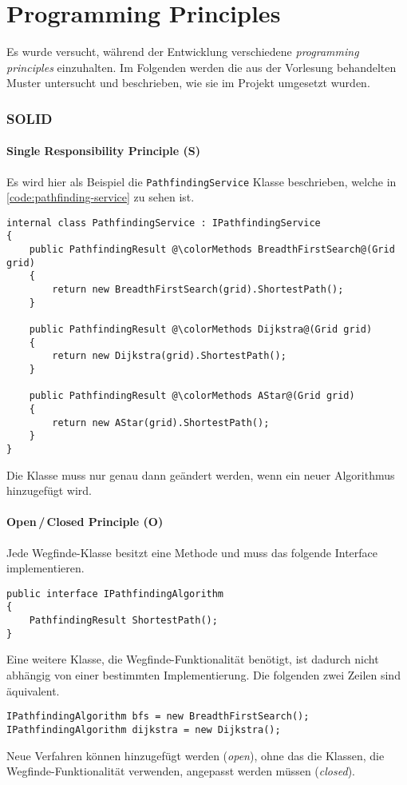 \part{Programming Principles} \label{part:programming-principles}
Es wurde versucht, während der Entwicklung
verschiedene \textit{programming principles} einzuhalten.
Im Folgenden werden die aus der Vorlesung behandelten Muster untersucht und
beschrieben, wie sie im Projekt umgesetzt wurden.

\section{SOLID}

\subsection{Single Responsibility Principle (S)}
Es wird hier als Beispiel die \lstinline{PathfindingService} Klasse
beschrieben, welche in \autoref{code:pathfinding-service} zu sehen ist.
\begin{lstlisting}[caption={\lstinline{PathfindingService} Klasse},
    label={code:pathfinding-service}]
internal class PathfindingService : IPathfindingService
{
    public PathfindingResult @\colorMethods BreadthFirstSearch@(Grid grid)
    {
        return new BreadthFirstSearch(grid).ShortestPath();
    }

    public PathfindingResult @\colorMethods Dijkstra@(Grid grid)
    {
        return new Dijkstra(grid).ShortestPath();
    }

    public PathfindingResult @\colorMethods AStar@(Grid grid)
    {
        return new AStar(grid).ShortestPath();
    }
}
\end{lstlisting}
Die Klasse muss nur genau dann geändert werden,
wenn ein neuer Algorithmus hinzugefügt wird.

\subsection{Open\,/\,Closed Principle (O)}
Jede Wegfinde-Klasse besitzt eine Methode 
und muss das folgende Interface implementieren.
\begin{lstlisting}[caption={Wegfinde-Algorithmus Interface},label={code:i-pathfinding}]
public interface IPathfindingAlgorithm
{
    PathfindingResult ShortestPath();
}
\end{lstlisting}
Eine weitere Klasse, die Wegfinde-Funktionalität benötigt, ist dadurch nicht abhängig
von einer bestimmten Implementierung. Die folgenden zwei Zeilen sind äquivalent.
\begin{lstlisting}[caption={Abstraktion der Wegfinde-Algorithmen},
label={code:pathfinding-abstracttion}]
IPathfindingAlgorithm bfs = new BreadthFirstSearch();
IPathfindingAlgorithm dijkstra = new Dijkstra();
\end{lstlisting}
Neue Verfahren können hinzugefügt werden (\textit{open}), ohne das die Klassen,
die Wegfinde-Funktionalität verwenden,
angepasst werden müssen (\textit{closed}).

